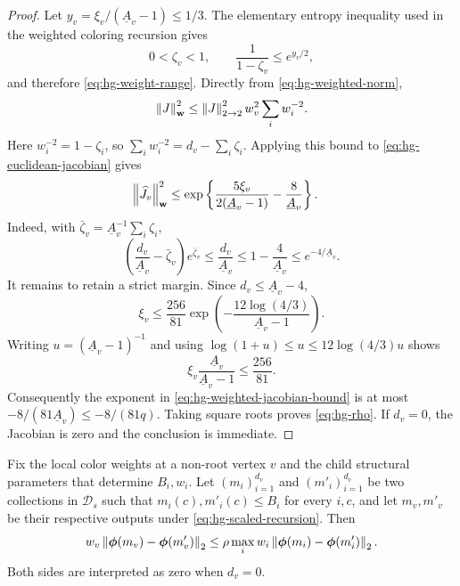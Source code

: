 \begin{proof}
Let \(y_v=\xi_v/(\underline A_v-1)\le1/3\).  The elementary entropy inequality
\cite[Fact~B.5]{CLMM2023} used in the weighted coloring recursion gives
\begin{equation}
 0<\zeta_v<1,\qquad
 \frac1{1-\zeta_v}\le e^{y_v/2},
 \label{eq:hg-entropy-inequality}
\end{equation}
and therefore \eqref{eq:hg-weight-range}.  Directly from
\eqref{eq:hg-weighted-norm},
\[
 \left\|J\right\|_{\mathbf w}^2
 \le \left\|J\right\|_{2\to2}^2 w_v^2\sum_iw_i^{-2}.
\]
Here \(w_i^{-2}=1-\zeta_i\), so
\(\sum_iw_i^{-2}=d_v-\sum_i\zeta_i\).
Applying this bound to \eqref{eq:hg-euclidean-jacobian} gives
\begin{align}
 \left\|\widehat J_v\right\|_{\mathbf w}^2
 &\le
 \exp\left\{
   \frac{5\xi_v}{2(\underline A_v-1)}-\frac8{\underline A_v}
 \right\}.
 \label{eq:hg-weighted-jacobian-bound}
\end{align}
Indeed, with \(\bar\zeta_v=\underline A_v^{-1}\sum_i\zeta_i\),
\[
 \left(\frac{d_v}{\underline A_v}-\bar\zeta_v\right)e^{\bar\zeta_v}
 \le\frac{d_v}{\underline A_v}
 \le1-\frac4{\underline A_v}
 \le e^{-4/\underline A_v}.
\]
It remains to retain a strict margin.  Since
\(d_v\le\underline A_v-4\),
\[
 \xi_v\le\frac{256}{81}
 \exp\left(-\frac{12\log(4/3)}{\underline A_v-1}\right).
\]
Writing \(u=(\underline A_v-1)^{-1}\) and using
$\log(1+u)\le u\le12\log(4/3)u$ shows
\[
 \xi_v\frac{\underline A_v}{\underline A_v-1}\le\frac{256}{81}.
\]
Consequently the exponent in \eqref{eq:hg-weighted-jacobian-bound} is at
most \(-8/(81\underline A_v)\le-8/(81q)\).  Taking square roots proves
\eqref{eq:hg-rho}.  If $d_v=0$, the Jacobian is zero and the conclusion is
immediate.
\end{proof}

\begin{lemma}
\label{lem:hg-finite-difference}
Fix the local color weights at a non-root vertex \(v\) and the child structural
parameters that determine \(B_i,w_i\).  Let
$(m_i)_{i=1}^{d_v}$ and $(m'_i)_{i=1}^{d_v}$ be two collections in
$\mathcal D_s$ such that
$m_i(c),m'_i(c)\le B_i$ for every $i,c$, and let
\(m_v,m'_v\) be their respective outputs under
\eqref{eq:hg-scaled-recursion}.  Then
\begin{equation}
 w_v\left\|\boldsymbol\phi(m_v)-\boldsymbol\phi(m'_v)\right\|_2
 \le
 \rho\max_i
 w_i\left\|\boldsymbol\phi(m_i)-\boldsymbol\phi(m'_i)\right\|_2 .
 \label{eq:hg-finite-difference}
\end{equation}
Both sides are interpreted as zero when $d_v=0$.
\end{lemma}

